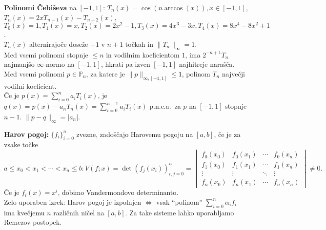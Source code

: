 \documentclass[a4paper,12pt]{article}
\theoremstyle{definition}
\def\P{\mathbb{P}}
\begin{document}
\textbf{Polinomi Čebiševa} na $[-1,1]$: $T_n(x) = \cos(n \arccos (x)), x \in [-1,1]$,
$T_n(x) = 2x T_{n-1}(x) - T_{n-2}(x)$, \\
$T_0(x) = 1, T_1(x) = x, T_2(x) = 2x^2 - 1,
T_3(x) = 4 x^3 - 3x, T_4(x) = 8x^4 - 8x^2 + 1$.\\
$T_n(x)$ alternirajoče doseže $\pm 1$ v $n+1$ točkah in $\|T_n\|_{\infty} = 1$.\\
Med vsemi polinomi stopnje $\leq n$ in vodilnim koeficientom $1$, ima $2^{-n+1}
T_n$ najmanjšo $\infty$-normo na $[-1,1]$, hkrati pa izven $[-1,1]$ najhitreje
narašča.\\
Med vsemi polinomi $p \in \P_n$, za katere je $\|p\|_{\infty, [-1,1]} \leq 1$,
polinom $T_n$ največji vodilni koeficient.\\
Če je $p(x) = \sum_{i=0}^n a_i T_i(x)$, je $q(x) = p(x) - a_n T_n(x) =
\sum_{i=0}^{n-1} a_i T_i(x)$ p.n.e.a.\ za $p$ na $[-1,1]$ stopnje $n-1$.
$\|p-q\|_{\infty} = |a_n|$.

\textbf{Harov pogoj:} $\{f_i\}_{i=0}^n$ zvezne, zadoščajo Harovemu pogoju na
$[a,b]$, če je za vsake točke $a \leq x_0 < x_1 < \cdots < x_n \leq b: V(f;x) =
\det (f_j(x_i))_{i,j = 0}^{n} = \begin{vmatrix}
  f_0(x_0) & f_0(x_1) & \cdots & f_0(x_n) \\
  f_1(x_0) & f_1(x_1) & \cdots & f_1(x_n) \\
  \vdots & \vdots & \ddots & \vdots \\
  f_n(x_0) & f_n(x_1) & \cdots & f_n(x_n)
 \end{vmatrix} \neq 0.$ Če je $f_i(x) = x^i$, dobimo Vandermondovo determinanto.\\
 Zelo uporaben izrek: Harov pogoj je izpolnjen $\iff$ vsak ``polinom''
 $\sum_{i=0}^n \alpha_i f_i$ ima kvečjemu $n$ različnih ničel na $[a,b]$.
 Za take sisteme lahko uporabljamo Remezov postopek.
\end{document}
